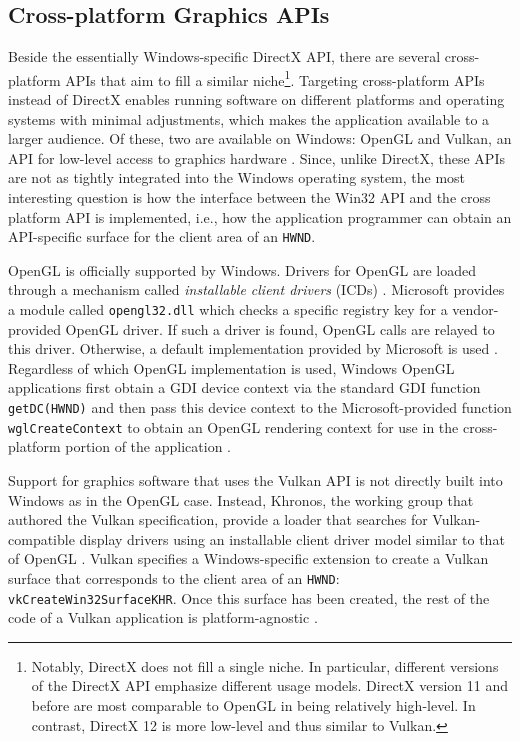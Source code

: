 		\subsection{Cross-platform Graphics APIs}
			Beside the essentially Windows-specific DirectX API, there are
			several cross-platform APIs that aim to fill a similar
			niche\footnote{Notably, DirectX does not fill a single niche. In
			particular, different versions of the DirectX API emphasize
			different usage models.  DirectX version 11 and before are most
			comparable to OpenGL in being relatively high-level. In contrast,
			DirectX 12 is more low-level and thus similar to Vulkan.}.
			Targeting cross-platform APIs instead of DirectX enables running
			software on different platforms and operating systems with minimal
			adjustments, which makes the application available to a larger
			audience. Of these, two are available on Windows: OpenGL and
			Vulkan, an API for low-level access to graphics hardware
			\cite[3]{vulkanspec}. Since, unlike DirectX, these APIs are not as
			tightly integrated
			into the Windows operating system, the most interesting question is
			how the interface between the Win32 API and the cross platform API
			is implemented, i.e., how the application programmer can obtain an
			API-specific surface for the client area of an \texttt{HWND}.

			OpenGL is officially supported by Windows. Drivers for OpenGL are
			loaded through a mechanism called \textit{installable client
			drivers} (ICDs) \cite{oglicd}. Microsoft provides a module called
			\texttt{opengl32.dll} which checks a specific registry key
			for a vendor-provided OpenGL driver. If such a driver is found,
			OpenGL calls are relayed to this driver. Otherwise, a
			default implementation provided by Microsoft is used \cite{oglcomp}. Regardless
			of which OpenGL implementation is used, Windows OpenGL applications
			first obtain a GDI device context via the standard GDI function
			\texttt{getDC(HWND)} and then pass this device context to the
			Microsoft-provided function \texttt{wglCreateContext} to obtain an
			OpenGL rendering context for use in the cross-platform portion
			of the application \cite{oglrc}.

			Support for graphics software that uses the Vulkan API is not
			directly built into Windows as in the OpenGL case. Instead,
			Khronos, the working group that authored the Vulkan specification,
			provide a loader that searches for Vulkan-compatible display
			drivers using an installable client driver model similar to that of
			OpenGL \cite{vulkanloader}. Vulkan specifies a Windows-specific
			extension to create a Vulkan surface that corresponds to the client
			area of an \texttt{HWND}: \texttt{vkCreateWin32SurfaceKHR}. Once
			this surface has been created, the rest of the code of a Vulkan
			application is platform-agnostic \cite[799]{vulkanspec}.

